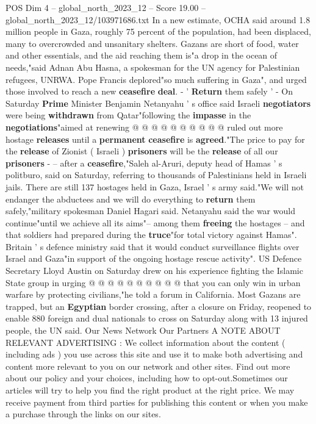 \begin{textsample}{POS Dim 4 – global\_north\_2023\_12 – Score 19.00 – global\_north\_2023\_12/103971686.txt}
In a new estimate, OCHA said around 1.8 million people in Gaza, roughly 75 percent of the population, had been displaced, many to overcrowded and unsanitary shelters.
Gazans are short of food, water and other essentials, and the aid reaching them is"a drop in the ocean of needs,"said Adnan Abu Hasna, a spokesman for the UN agency for Palestinian refugees, UNRWA.
Pope Francis deplored"so much suffering in Gaza", and urged those involved to reach a new \textbf{ceasefire} \textbf{deal}. - ' \textbf{Return} them safely ' - On Saturday \textbf{Prime} Minister Benjamin Netanyahu ' s office said Israeli \textbf{negotiators} were being \textbf{withdrawn} from Qatar"following the \textbf{impasse} in the \textbf{negotiations}"aimed at renewing @ @ @ @ @ @ @ @ @ @ ruled out more hostage \textbf{releases} until a \textbf{permanent} \textbf{ceasefire} is \textbf{agreed}."The price to pay for the \textbf{release} of Zionist ( Israeli ) \textbf{prisoners} will be the \textbf{release} of all our \textbf{prisoners} - -- after a \textbf{ceasefire},"Saleh al-Aruri, deputy head of Hamas ' s politburo, said on Saturday, referring to thousands of Palestinians held in Israeli jails.
There are still 137 hostages held in Gaza, Israel ' s army said."We will not endanger the abductees and we will do everything to \textbf{return} them safely,"military spokesman Daniel Hagari said.
Netanyahu said the war would continue"until we achieve all its aims"-- among them \textbf{freeing} the hostages -- and that soldiers had prepared during the \textbf{truce}"for total victory against Hamas".
Britain ' s defence ministry said that it would conduct surveillance flights over Israel and Gaza"in support of the ongoing hostage rescue activity".
US Defence Secretary Lloyd Austin on Saturday drew on his experience fighting the Islamic State group in urging @ @ @ @ @ @ @ @ @ @ that you can only win in urban warfare by protecting civilians,"he told a forum in California.
Most Gazans are trapped, but an \textbf{Egyptian} border crossing, after a closure on Friday, reopened to enable 880 foreign and dual nationals to cross on Saturday along with 13 injured people, the UN said.
Our News Network Our Partners A NOTE ABOUT RELEVANT ADVERTISING : We collect information about the content ( including ads ) you use across this site and use it to make both advertising and content more relevant to you on our network and other sites.
Find out more about our policy and your choices, including how to opt-out.Sometimes our articles will try to help you find the right product at the right price.
We may receive payment from third parties for publishing this content or when you make a purchase through the links on our sites.

\end{textsample}
